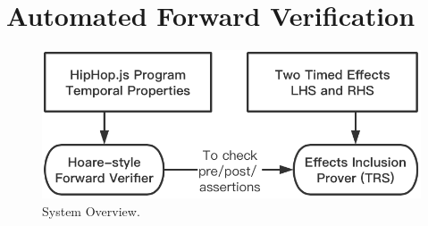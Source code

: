 \documentclass[acmsmall,10pt,review]{acmart}
\newcommand{\timedEffects}{\emph{TimEffs}}
\newcommand{\code}[1]{{\tt{\ensuremath{\m{#1}}}}}
\newcommand{\m}{\mathit}
\newcommand{\lappend}{\mathrel{\texttt{++}}}
\def\defeq{\ensuremath{\,\triangleq}}
\newcommand\figref[1]{Fig. \textcolor{black}{\ref{#1}}.}
\begin{document}
{



\section{Automated Forward Verification}\label{sec:Verification}




\begin{figure}
    \vspace{-3mm}
\centering
\includegraphics[width=0.5\columnwidth]{verification.png}
        \vspace{-3mm}
\caption{\label{fig:Verification_oberview}System Overview.}
      \vspace{-1mm}
\end{figure}

}
\end{document}
